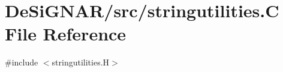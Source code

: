 \hypertarget{stringutilities_8_c}{}\section{De\+Si\+G\+N\+A\+R/src/stringutilities.C File Reference}
\label{stringutilities_8_c}
{\ttfamily \#include $<$stringutilities.\+H$>$}\newline
